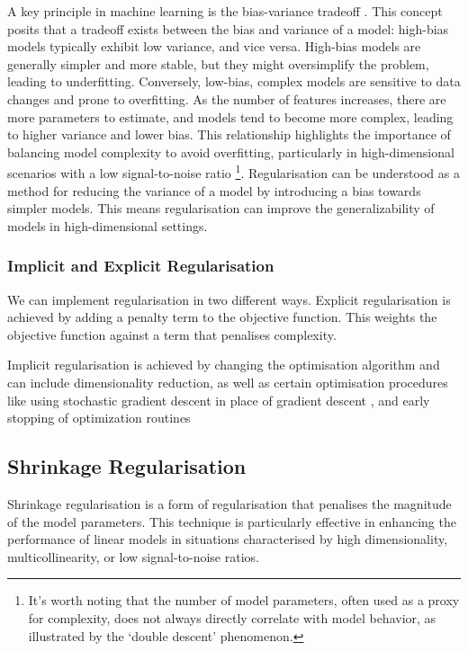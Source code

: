 A key principle in machine learning is the bias-variance tradeoff \citep{curth2023u, hastie2009elements}.
This concept posits that a tradeoff exists between the bias and variance of a model: high-bias models typically exhibit low variance, and vice versa.
High-bias models are generally simpler and more stable, but they might oversimplify the problem, leading to underfitting.
Conversely, low-bias, complex models are sensitive to data changes and prone to overfitting.
As the number of features increases, there are more parameters to estimate, and models tend to become more complex, leading to higher variance and lower bias.
This relationship highlights the importance of balancing model complexity to avoid overfitting, particularly in high-dimensional scenarios with a low signal-to-noise ratio \citep{mcintosh2021comparison}\footnote{It's worth noting that the number of model parameters, often used as a proxy for complexity, does not always directly correlate with model behavior, as illustrated by the `double descent' phenomenon.}.
Regularisation can be understood as a method for reducing the variance of a model by introducing a bias towards simpler models.
This means regularisation can improve the generalizability of models in high-dimensional settings.

\subsubsection{Implicit and Explicit Regularisation}

We can implement regularisation in two different ways.
Explicit regularisation is achieved by adding a penalty term to the objective function.
This weights the objective function against a term that penalises complexity.

Implicit regularisation is achieved by changing the optimisation algorithm and can include dimensionality reduction, as well as certain optimisation procedures like using stochastic gradient descent in place of gradient descent \citep{ali2020implicit}, and early stopping of optimization routines \citep{yao2007early}

\subsection{Shrinkage Regularisation}

Shrinkage regularisation is a form of regularisation that penalises the magnitude of the model parameters.
This technique is particularly effective in enhancing the performance of linear models in situations characterised by high dimensionality, multicollinearity, or low signal-to-noise ratios.


